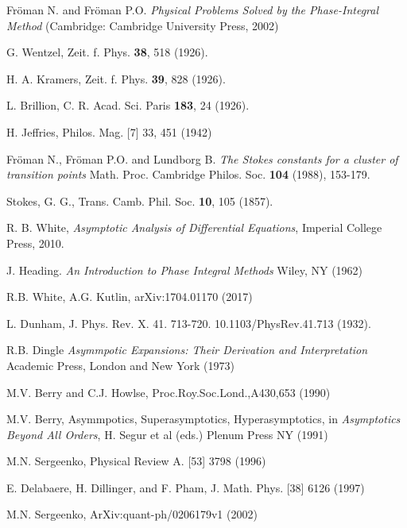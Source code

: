 \documentclass[atmp]{ipart_v1}
\begin{document}
\begin{thebibliography}{30}

 Fr\"oman N. and Fr\"oman P.O. \textit{Physical Problems Solved by the Phase-Integral Method} (Cambridge: Cambridge University Press, 2002)

 G. Wentzel, Zeit. f. Phys. \textbf{38}, 518 (1926).

 H. A. Kramers, Zeit. f. Phys. \textbf{39}, 828 (1926).

 L. Brillion, C. R. Acad. Sci. Paris \textbf{183}, 24 (1926).

 H. Jeffries, Philos. Mag. [7] 33, 451 (1942)

 Fr\"oman N., Fr\"oman P.O. and Lundborg B. \textit{The Stokes constants for a cluster of transition
points} Math. Proc. Cambridge Philos. Soc. \textbf{104} (1988), 153-179.


 Stokes, G. G., Trans. Camb. Phil. Soc. \textbf{10}, 105 (1857).

 R. B. White,
 {\it Asymptotic Analysis of Differential Equations}, Imperial College Press, 2010.

 J. Heading. {\it An Introduction to Phase Integral Methods} 
Wiley, NY (1962)

 R.B. White, A.G. Kutlin, arXiv:1704.01170 (2017)

 L. Dunham, J. Phys. Rev. X. 41. 713-720. 10.1103/PhysRev.41.713 (1932).
 
 R.B. Dingle {\it Asymmpotic Expansions: Their Derivation and 
Interpretation} Academic Press, London and New York (1973)

 M.V. Berry and C.J. Howlse, Proc.Roy.Soc.Lond.,A430,653 (1990)

 M.V. Berry, Asymmpotics, Superasymptotics,
 Hyperasymptotics, in {\it Asymptotics Beyond All Orders}, H. Segur et al (eds.) Plenum Press NY (1991)

 M.N. Sergeenko, Physical Review A. [53] 3798 (1996)

 E. Delabaere, H. Dillinger, and F. Pham, J. Math. Phys. [38] 6126 (1997)

 M.N. Sergeenko, ArXiv:quant-ph/0206179v1 (2002)


\end{thebibliography}
\end{document}
